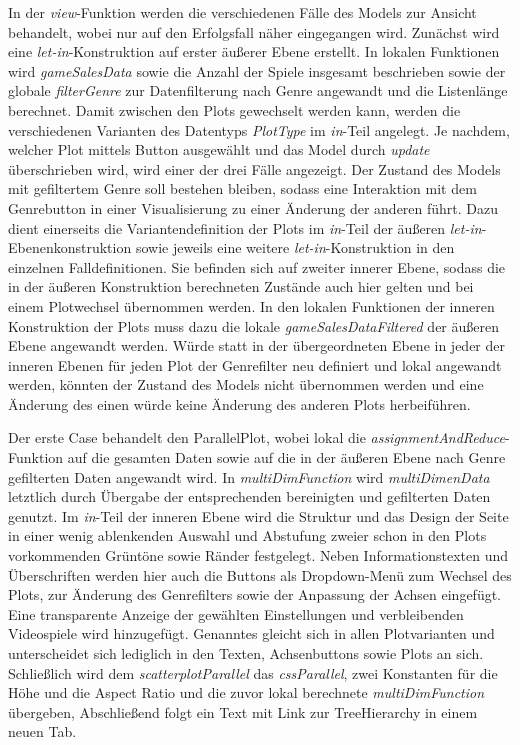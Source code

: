 \documentclass[usegeometry=true]{scrartcl}
\begin{document}
In der \textit{view}-Funktion werden die verschiedenen Fälle des Models zur Ansicht behandelt, wobei nur auf den Erfolgsfall näher eingegangen wird. 
Zunächst wird eine \textit{let-in}-Konstruktion auf erster äußerer Ebene erstellt. 
In lokalen Funktionen wird \textit{gameSalesData} sowie die Anzahl der Spiele insgesamt beschrieben 
sowie der globale \textit{filterGenre} zur Datenfilterung nach Genre angewandt und die Listenlänge berechnet. 
Damit zwischen den Plots gewechselt werden kann, 
werden die verschiedenen Varianten des Datentyps \textit{PlotType} im \textit{in}-Teil angelegt. 
Je nachdem, welcher Plot mittels Button ausgewählt und das Model durch \textit{update} überschrieben wird, wird einer der drei Fälle angezeigt. 
Der Zustand des Models mit gefiltertem Genre soll bestehen bleiben, 
sodass eine Interaktion mit dem Genrebutton in einer Visualisierung zu einer Änderung der anderen führt.
Dazu dient einerseits die Variantendefinition der Plots im \textit{in}-Teil der äußeren \textit{let-in}-Ebenenkonstruktion 
sowie jeweils eine weitere \textit{let-in}-Konstruktion in den einzelnen Falldefinitionen.
Sie befinden sich auf zweiter innerer Ebene, sodass die in der äußeren Konstruktion berechneten Zustände auch hier gelten 
und bei einem Plotwechsel übernommen werden. 
In den lokalen Funktionen der inneren Konstruktion der Plots muss dazu die lokale \textit{gameSalesDataFiltered} der äußeren Ebene angewandt werden. 
Würde statt in der übergeordneten Ebene in jeder der inneren Ebenen für jeden Plot der Genrefilter neu definiert und lokal angewandt werden, 
könnten der Zustand des Models nicht übernommen werden und eine Änderung des einen würde keine Änderung des anderen Plots herbeiführen.

Der erste Case behandelt den ParallelPlot, wobei lokal die \textit{assignmentAndReduce}-Funktion auf die gesamten Daten 
sowie auf die in der äußeren Ebene nach Genre gefilterten Daten angewandt wird.
In \textit{multiDimFunction} wird \textit{multiDimenData} letztlich durch Übergabe der entsprechenden bereinigten und gefilterten Daten genutzt. 
Im \textit{in}-Teil der inneren Ebene wird die Struktur und das Design der Seite in einer wenig ablenkenden Auswahl und Abstufung zweier 
schon in den Plots vorkommenden Grüntöne sowie Ränder festgelegt.
Neben Informationstexten und Überschriften werden hier auch die Buttons als Dropdown-Menü zum Wechsel des Plots, 
zur Änderung des Genrefilters sowie der Anpassung der Achsen eingefügt.
Eine transparente Anzeige der gewählten Einstellungen und verbleibenden Videospiele wird hinzugefügt.
Genanntes gleicht sich in allen Plotvarianten und unterscheidet sich lediglich in den Texten, Achsenbuttons sowie Plots an sich.
Schließlich wird dem \textit{scatterplotParallel} das \textit{cssParallel}, zwei Konstanten für die Höhe und die Aspect Ratio 
und die zuvor lokal berechnete \textit{multiDimFunction} übergeben, 
Abschließend folgt ein Text mit Link zur TreeHierarchy in einem neuen Tab.
\end{document}
